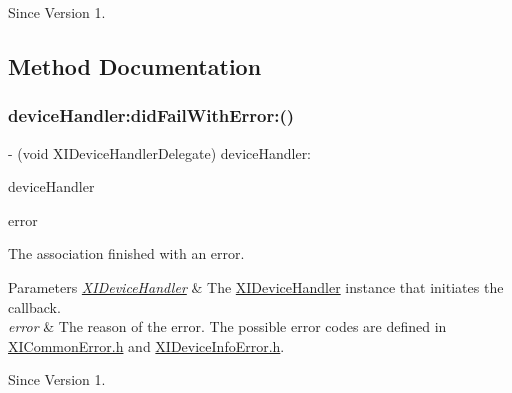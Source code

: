 \begin{DoxySince}{Since}
Version 1. 
\end{DoxySince}


\subsection{Method Documentation}
\hypertarget{protocol_x_i_device_handler_delegate_01-p_a6de7852e3e6bef6f5183820f3472fd4b}{}\label{protocol_x_i_device_handler_delegate_01-p_a6de7852e3e6bef6f5183820f3472fd4b} 
\subsubsection{\texorpdfstring{device\+Handler\+:did\+Fail\+With\+Error\+:()}{deviceHandler:didFailWithError:()}}
{\footnotesize\ttfamily -\/ (void X\+I\+Device\+Handler\+Delegate) device\+Handler\+: \begin{DoxyParamCaption}\item[{(id$<$ X\+I\+Device\+Handler $>$)}]{device\+Handler }\item[{didFailWithError:(N\+S\+Error $\ast$)}]{error }\end{DoxyParamCaption}}



The association finished with an error. 


\begin{DoxyParams}{Parameters}
{\em \hyperlink{class_x_i_device_handler-p}{X\+I\+Device\+Handler}} & The \hyperlink{class_x_i_device_handler-p}{X\+I\+Device\+Handler} instance that initiates the callback. \\
\hline
{\em error} & The reason of the error. The possible error codes are defined in \hyperlink{_x_i_common_error_8h}{X\+I\+Common\+Error.\+h} and \hyperlink{_x_i_device_info_error_8h}{X\+I\+Device\+Info\+Error.\+h}. \\
\hline
\end{DoxyParams}
\begin{DoxySince}{Since}
Version 1. 
\end{DoxySince}
\hypertarget{protocol_x_i_device_handler_delegate_01-p_adb58e010ff32be7cf5edec6ee80b4d9b}{}\label{protocol_x_i_device_handler_delegate_01-p_adb58e010ff32be7cf5edec6ee80b4d9b} 
